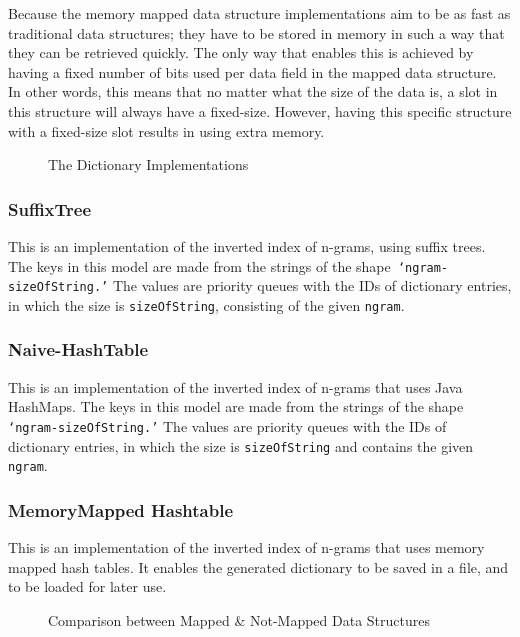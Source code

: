 Because the memory mapped data structure implementations aim to be as fast as traditional data structures; they have to be stored in memory in such a way that they can be retrieved quickly. The only way that enables this
is achieved by having a fixed number of bits used per data field in the mapped data structure. In other words, this means that no matter what the size of the data is, a slot in this structure will always have a fixed-size. However, having this specific structure with a fixed-size slot results in using extra memory.

\begin{figure}[h!]
  \caption{The Dictionary Implementations}
  \centering
   \label{fig:dictionaryClasses}  
\end{figure}

\subsubsection{SuffixTree}  
This is an implementation of the inverted index of n-grams, using suffix trees. The keys in this model are made from the strings of the shape\texttt{ `ngram-sizeOfString.'} The values are priority queues with the IDs of dictionary entries, in which the size is \texttt{sizeOfString}, consisting of the given \texttt{ngram}.

\subsubsection{Naive-HashTable}
This is an implementation of the inverted index of n-grams that uses Java HashMaps. The keys in this model are made from the strings of the shape\texttt{ `ngram-sizeOfString.'} The values are priority queues with the IDs of dictionary entries, in which the size is \texttt{sizeOfString} and contains the given \texttt{ngram}.
  
\subsubsection{MemoryMapped Hashtable}
This is an implementation of the inverted index of n-grams that uses memory mapped hash tables. It enables the generated dictionary to be saved in a file, and to be loaded for later use.

\begin{figure}[h!]
  \caption{Comparison between Mapped \& Not-Mapped Data Structures}
  \centering
   \label{fig:mappedDataStructures}  
\end{figure}


  
